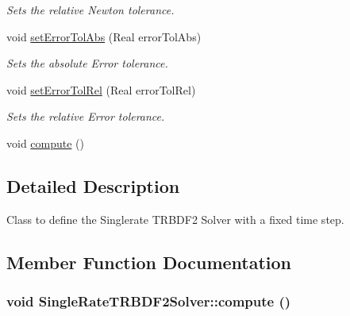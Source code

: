 \begin{DoxyCompactItemize}
\begin{DoxyCompactList}\small\item\em Sets the relative Newton tolerance. \item\end{DoxyCompactList}\item 
\hypertarget{classSingleRateTRBDF2Solver_ada3abba75dbb15b4bb524bb7b144f634}{
void \hyperlink{classSingleRateTRBDF2Solver_ada3abba75dbb15b4bb524bb7b144f634}{setErrorTolAbs} (Real errorTolAbs)}
\label{classSingleRateTRBDF2Solver_ada3abba75dbb15b4bb524bb7b144f634}

\begin{DoxyCompactList}\small\item\em Sets the absolute Error tolerance. \item\end{DoxyCompactList}\item 
\hypertarget{classSingleRateTRBDF2Solver_ac951fd8c8caf2292cf9c93a47495b44b}{
void \hyperlink{classSingleRateTRBDF2Solver_ac951fd8c8caf2292cf9c93a47495b44b}{setErrorTolRel} (Real errorTolRel)}
\label{classSingleRateTRBDF2Solver_ac951fd8c8caf2292cf9c93a47495b44b}

\begin{DoxyCompactList}\small\item\em Sets the relative Error tolerance. \item\end{DoxyCompactList}\item 
void \hyperlink{classSingleRateTRBDF2Solver_ab9beae6ea765fe34398a02b7b99da10f}{compute} ()
\end{DoxyCompactItemize}


\subsection{Detailed Description}
Class to define the Singlerate TRBDF2 Solver with a fixed time step. 

\subsection{Member Function Documentation}
\hypertarget{classSingleRateTRBDF2Solver_ab9beae6ea765fe34398a02b7b99da10f}{
\subsubsection[{compute}]{\setlength{\rightskip}{0pt plus 5cm}void SingleRateTRBDF2Solver::compute ()}}
\label{classSingleRateTRBDF2Solver_ab9beae6ea765fe34398a02b7b99da10f}


